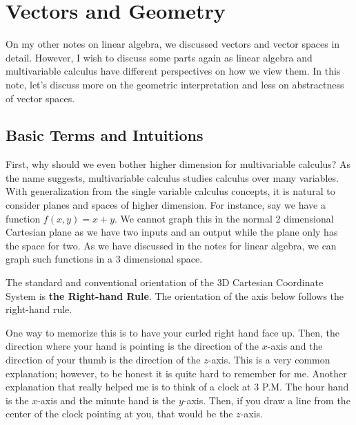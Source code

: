 \documentclass[../../../main.tex]{subfiles}
\begin{document}
\chapter{Vectors and Geometry}

On my other notes on linear algebra, we discussed vectors and
vector spaces in detail. However, I wish to discuss some parts
again as linear algebra and multivariable calculus have different
perspectives on how we view them. In this note, let's discuss
more on the geometric interpretation and less on abstractness
of vector spaces.

\section{Basic Terms and Intuitions}

First, why should we even bother higher dimension for multivariable
calculus? As the name suggests, multivariable calculus studies
calculus over many variables. With generalization from the single
variable calculus concepts, it is natural to consider planes and
spaces of higher dimension. For instance, say we have a function
$f(x, y) = x + y$. We cannot graph this in the normal 2 dimensional
Cartesian plane as we have two inputs and an output while the plane
only has the space for two. As we have discussed in the notes for
linear algebra, we can graph such functions in a 3 dimensional
space.

The standard and conventional orientation of the 3D Cartesian
Coordinate System is \textbf{the Right-hand Rule}. The orientation
of the axis below follows the right-hand rule.

\begin{figure}[H]
\centering
{}
\end{figure}

One way to memorize this is to have your curled right hand face up.
Then, the direction where your hand is pointing is the direction of
the $x$-axis and the direction of your thumb is the direction of the
$z$-axis. This is a very common explanation; however, to be honest
it is quite hard to remember for me. Another explanation that really
helped me is to think of a clock at 3 P.M. The hour hand is the
$x$-axis and the minute hand is the $y$-axis. Then, if you draw
a line from the center of the clock pointing at you, that would
be the $z$-axis.
\end{document}
